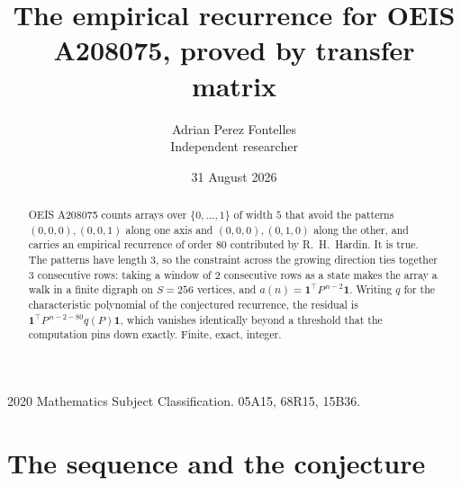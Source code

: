 \documentclass[11pt,a4paper]{article}
\title{The empirical recurrence for OEIS A208075, proved by transfer matrix}
\author{Adrian Perez Fontelles\\ \small Independent researcher}
\date{31 August 2026}
\theoremstyle{plain}
\theoremstyle{definition}
\begin{document}
\maketitle

\begin{abstract}
OEIS A208075 counts arrays over $\{0,\dots,1\}$ of width $5$ that avoid the patterns
$(0,0,0), (0,0,1)$ along one axis and $(0,0,0), (0,1,0)$ along the other, and carries an empirical recurrence of
order $80$ contributed by R.~H.~Hardin. It is true. The patterns have length $3$, so
the constraint across the growing direction ties together $3$ consecutive rows: taking a
window of $2$ consecutive rows as a state makes the array a walk in a finite digraph
on $S=256$ vertices, and $a(n)=\mathbf{1}^{\!\top}P^{\,n-2}\mathbf{1}$. Writing $q$
for the characteristic polynomial of the conjectured recurrence, the residual is
$\mathbf{1}^{\!\top}P^{\,n-2-80}q(P)\mathbf{1}$, which vanishes identically
beyond a threshold that the computation pins down exactly. Finite, exact, integer.
\end{abstract}

\noindent\small 2020 Mathematics Subject Classification. 05A15, 68R15, 15B36.\normalsize

\section{The sequence and the conjecture}
\end{document}
